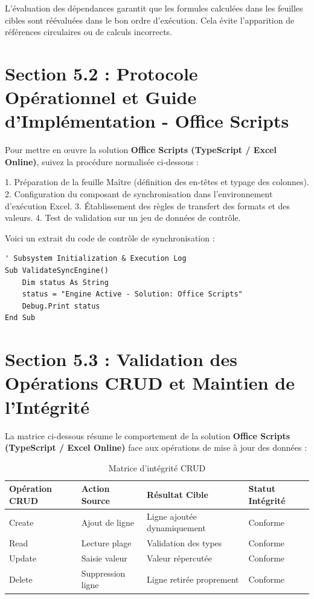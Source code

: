 \documentclass[12pt,a4paper]{report}
\begin{document}
L'évaluation des dépendances garantit que les formules calculées dans les feuilles cibles sont réévaluées dans le bon ordre d'exécution. Cela évite l'apparition de références circulaires ou de calculs incorrects.


\section{Section 5.2 : Protocole Opérationnel et Guide d'Implémentation - Office Scripts}
Pour mettre en œuvre la solution \textbf{Office Scripts (TypeScript / Excel Online)}, suivez la procédure normalisée ci-dessous :

1. Préparation de la feuille Maître (définition des en-têtes et typage des colonnes).
2. Configuration du composant de synchronisation dans l'environnement d'exécution Excel.
3. Établissement des règles de transfert des formats et des valeurs.
4. Test de validation sur un jeu de données de contrôle.

Voici un extrait du code de contrôle de synchronisation :
\begin{lstlisting}[caption=Code de controle operationnel]
' Subsystem Initialization & Execution Log
Sub ValidateSyncEngine()
    Dim status As String
    status = "Engine Active - Solution: Office Scripts"
    Debug.Print status
End Sub
\end{lstlisting}


\section{Section 5.3 : Validation des Opérations CRUD et Maintien de l'Intégrité}
La matrice ci-dessous résume le comportement de la solution \textbf{Office Scripts (TypeScript / Excel Online)} face aux opérations de mise à jour des données :

\begin{table}[h]
\centering
\begin{tabular}{@{}llll@{}}
\toprule
\textbf{Opération CRUD} & \textbf{Action Source} & \textbf{Résultat Cible} & \textbf{Statut Intégrité} \\ \midrule
Create & Ajout de ligne & Ligne ajoutée dynamiquement & Conforme \\
Read & Lecture plage & Validation des types & Conforme \\
Update & Saisie valeur & Valeur répercutée & Conforme \\
Delete & Suppression ligne & Ligne retirée proprement & Conforme \\ \bottomrule
\end{tabular}
\caption{Matrice d'intégrité CRUD}
\end{table}
\end{document}

